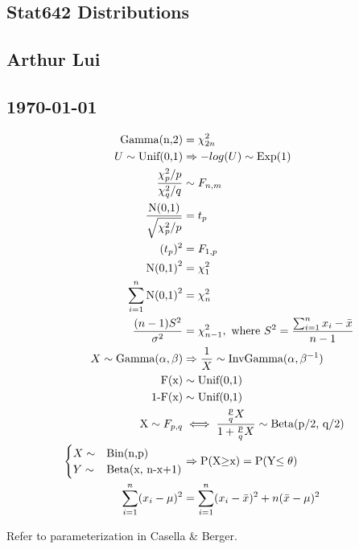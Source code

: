 \documentclass{article}                                                   %
\def\wl{\par \vspace{\baselineskip}}                                      %
\def\imply{\Rightarrow}
\begin{document}
\begin{center}                                                            %
  \section*{\textbf{Stat642 Distributions}}                               %
  \subsection*{\textbf{Arthur Lui}}                                       %
  \subsection*{\noindent\today}                                           %
\end{center}                                                              %
  
  \setlength{\jot}{12pt}
  \begin{align*}
    \text{Gamma(n,2)} & = \chi^2_{2n} \\
    U \sim \text{Unif(0,1)} & \imply -log(U) \sim \text{Exp(1)} \\
    \frac{\chi^2_p/p}{\chi^2_q/q} & \sim F_{n,m} \\
    \frac{\text{N(0,1)}}{\sqrt{\chi^2_p/p}} & = t_p \\
    (t_p)^2 & = F_{1,p} \\
    \text{N(0,1)}^2 & = \chi^2_1 \\
    \sum_{i=1}^n{\text{N(0,1)}^2} & = \chi^2_n \\
    \frac{(n-1)S^2}{\sigma^2} &= \chi^2_{n-1}, 
    \text{ where } S^2 = \frac{\sum_{i=1}^n {x_i-\bar x}}{n-1}\\
    X \sim \text{Gamma}(\alpha,\beta) &\imply \frac{1}{X} \sim \text{InvGamma}(\alpha,\beta^{-1}) \\
    \text{F(x)}   &\sim \text{Unif(0,1)} \\
    \text{1-F(x)} &\sim \text{Unif(0,1)} \\
    \text X \sim F_{p,q} &\iff \frac{\frac{p}{q} X}{1+\frac{p}{q} X} \sim \text{Beta(p/2, q/2)} \\
    \begin{cases} 
        X \sim &\text{Bin(n,p)} \\
        Y \sim &\text{Beta(x, n-x+1)}
    \end{cases}
    &\imply \text{P(X$\ge$x)} = \text{P(Y$\le\theta$)} \\
    \sum_{i=1}^n (x_i-\mu)^2 &= \sum_{i=1}^n (x_i-\bar{x})^2 + n(\bar x-\mu)^2
  \end{align*}

  \wl
  Refer to parameterization in Casella \& Berger.
\end{document}
